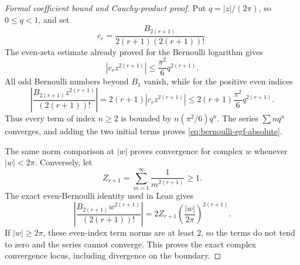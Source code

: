 \documentclass[11pt,oneside]{article}
\theoremstyle{definition}
\theoremstyle{remark}
\begin{document}
\begin{proof}[Formal coefficient bound and Cauchy-product proof]
Put \(q=\lvert z\rvert/(2\pi)\), so \(0\le q<1\), and set
\[
 c_r=\frac{B_{2(r+1)}}{2(r+1)(2(r+1))!}.
\]
The even-zeta estimate already proved for the Bernoulli logarithm gives
\[
 \left\lvert c_rz^{2(r+1)}\right\rvert
 \le \frac{\pi^2}{6}q^{2(r+1)}.
\]
All odd Bernoulli numbers beyond \(B_1\) vanish, while for the positive even
indices
\[
 \left\lvert\frac{B_{2(r+1)}z^{2(r+1)}}{(2(r+1))!}\right\rvert
 =2(r+1)\left\lvert c_rz^{2(r+1)}\right\rvert
 \le 2(r+1)\frac{\pi^2}{6}q^{2(r+1)}.
\]
Thus every term of index \(n\ge2\) is bounded by
\(n(\pi^2/6)q^n\).  The series \(\sum n q^n\) converges, and adding the two
initial terms proves \eqref{eq:bernoulli-egf-absolute}.

The same norm comparison at \(\lvert w\rvert\) proves convergence for complex
\(w\) whenever \(\lvert w\rvert<2\pi\).  Conversely, let
\[
 Z_{r+1}=\sum_{m=1}^{\infty}\frac{1}{m^{2(r+1)}}\ge 1.
\]
The exact even-Bernoulli identity used in Lean gives
\[
 \left\lvert
   \frac{B_{2(r+1)}w^{2(r+1)}}{(2(r+1))!}
 \right\rvert
 =2Z_{r+1}
   \left(\frac{\lvert w\rvert}{2\pi}\right)^{2(r+1)}.
\]
If \(\lvert w\rvert\ge2\pi\), these even-index term norms are at least \(2\),
so the terms do not tend to zero and the series cannot converge.  This proves
the exact complex convergence locus, including divergence on the boundary.


\end{proof}
\end{document}
